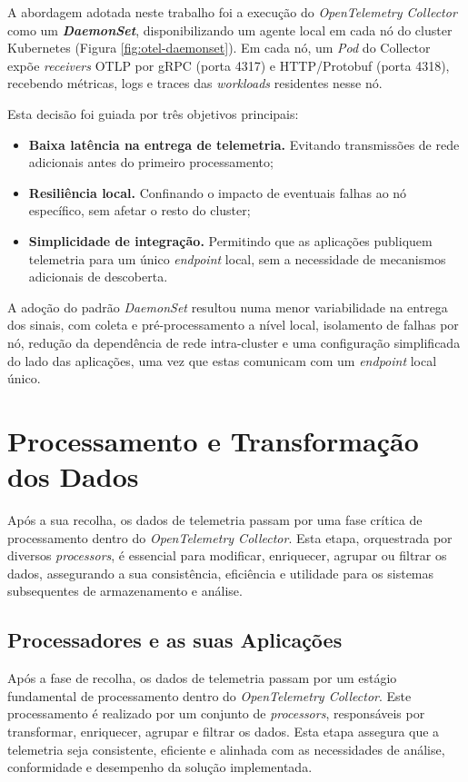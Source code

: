 A abordagem adotada neste trabalho foi a execução do \textit{OpenTelemetry Collector} como um \textbf{\textit{DaemonSet}}, disponibilizando um agente local em cada nó do cluster Kubernetes (Figura \ref{fig:otel-daemonset}). Em cada nó, um \textit{Pod} do Collector expõe \textit{receivers} OTLP por gRPC (porta 4317) e HTTP/Protobuf (porta 4318), recebendo métricas, logs e traces das \textit{workloads} residentes nesse nó.

Esta decisão foi guiada por três objetivos principais:

\begin{itemize}
    \item \textbf{Baixa latência na entrega de telemetria.} Evitando transmissões de rede adicionais antes do primeiro processamento;
    \item \textbf{Resiliência local.} Confinando o impacto de eventuais falhas ao nó específico, sem afetar o resto do cluster;
    \item \textbf{Simplicidade de integração.} Permitindo que as aplicações publiquem telemetria para um único \textit{endpoint} local, sem a necessidade de mecanismos adicionais de descoberta.
\end{itemize}

A adoção do padrão \textit{DaemonSet} resultou numa menor variabilidade na entrega dos sinais, com coleta e pré-processamento a nível local, isolamento de falhas por nó, redução da dependência de rede intra-cluster e uma configuração simplificada do lado das aplicações, uma vez que estas comunicam com um \textit{endpoint} local único.


\section{Processamento e Transformação dos Dados}

Após a sua recolha, os dados de telemetria passam por uma fase crítica de processamento dentro do \textit{OpenTelemetry Collector}. Esta etapa, orquestrada por diversos \textit{processors}, é essencial para modificar, enriquecer, agrupar ou filtrar os dados, assegurando a sua consistência, eficiência e utilidade para os sistemas subsequentes de armazenamento e análise.


\subsection{Processadores e as suas Aplicações}

Após a fase de recolha, os dados de telemetria passam por um estágio fundamental de processamento dentro do \textit{OpenTelemetry Collector}. Este processamento é realizado por um conjunto de \textit{processors}, responsáveis por transformar, enriquecer, agrupar e filtrar os dados. Esta etapa assegura que a telemetria seja consistente, eficiente e alinhada com as necessidades de análise, conformidade e desempenho da solução implementada.

